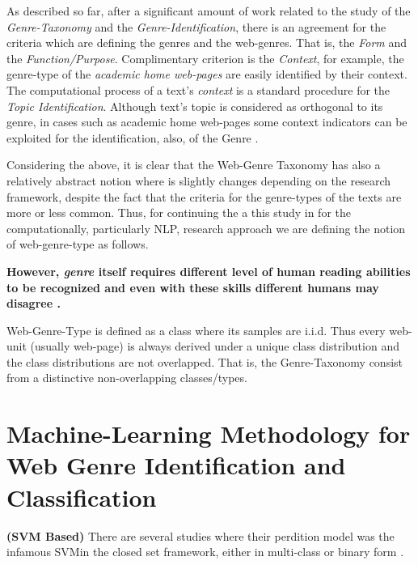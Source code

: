 As described so far, after a significant amount of work related to the study of the \textit{Genre-Taxonomy} and the \textit{Genre-Identification}, there is an agreement for the criteria which are defining the genres and the  web-genres. That is, the \textit{Form} and the \textit{Function/Purpose}. Complimentary criterion is the \textit{Context}, for example, the genre-type of the \textit{academic home web-pages} are easily identified by their context. The computational process of a text's \textit{context} is a standard procedure for the \textit{Topic Identification}. Although text's topic is considered as orthogonal to its genre, in cases such as academic home web-pages some context indicators can be exploited for the identification, also, of the Genre \parencite{coutinho2009describe,crowston2011problems,kanaris2009learning,jebari2015combination,gollapalli2011identifying}. 

Considering the above, it is clear that the Web-Genre Taxonomy has also a relatively abstract notion where is slightly changes depending on the research framework, despite the fact that the criteria for the genre-types of the texts are more or less common. Thus, for continuing the a this study in for the computationally, particularly NLP, research approach we are defining the notion of web-genre-type as follows.   

\textbf{However, \textit{genre} itself requires different level of human reading abilities to be recognized and even with these skills different humans may disagree \parencite{mccarthy2009psychological}.}

\begin{definition} Web-Genre-Type is defined as a class where its samples are i.i.d. Thus every web-unit (usually web-page) is always derived under a unique class distribution and the class distributions are not overlapped. That is, the Genre-Taxonomy consist from a distinctive non-overlapping classes/types.
\end{definition}

\section{Machine-Learning Methodology for Web Genre Identification and Classification}\label{chap:relevant_work:sec:machine_learning_methods}

\textbf{(SVM Based)} There are several studies where their perdition model was the infamous SVMin the closed set framework, either in multi-class or binary form \parencite{dai2018fine}. 


